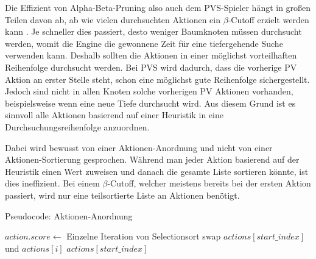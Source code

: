 Die Effizient von Alpha-Beta-Pruning also auch dem \ac{PVS}-Spieler hängt in großen Teilen davon ab, ab wie vielen durchsuchten Aktionen ein $\beta$-Cutoff erzielt werden kann \cite{2003.AlphaBetaSearch}. Je schneller dies passiert, desto weniger Baumknoten müssen durchsucht werden, womit die Engine die gewonnene Zeit für eine tiefergehende Suche verwenden kann. Deshalb sollten die Aktionen in einer möglichst vorteilhaften Reihenfolge durchsucht werden. Bei \ac{PVS} wird dadurch, dass die vorherige \ac{PV} Aktion an erster Stelle steht, schon eine möglichst gute Reihenfolge sichergestellt. Jedoch sind nicht in allen Knoten solche vorherigen \ac{PV} Aktionen vorhanden, beispielsweise wenn eine neue Tiefe durchsucht wird. Aus diesem Grund ist es sinnvoll alle Aktionen basierend auf einer Heuristik in eine Durchsuchungsreihenfolge anzuordnen.

Dabei wird bewusst von einer Aktionen-Anordnung und nicht von einer Aktionen-Sortierung gesprochen. Während man jeder Aktion basierend auf der Heuristik einen Wert zuweisen und danach die gesamte Liste sortieren könnte, ist dies ineffizient. Bei einem $\beta$-Cutoff, welcher meistens bereits bei der ersten Aktion passiert, wird nur eine teilsortierte Liste an Aktionen benötigt. \cite{2022.MoveOrdering}


\begin{algorithm}[!ht]
    \caption{Pseudocode: Aktionen-Anordnung}
    \label{algo:action-ordering}
    \begin{algorithmic}[1]
        \State $action.score \gets $ 
        \EndFor
        \EndFunction
        \LineComment Einzelne Iteration von Selectionsort
        \State swap $actions\left[start\_index\right]$ und $actions\left[i\right]$
        \EndIf
        \State \Return $actions\left[start\_index\right]$
        \EndFor
        \EndFunction
    \end{algorithmic}
\end{algorithm}

